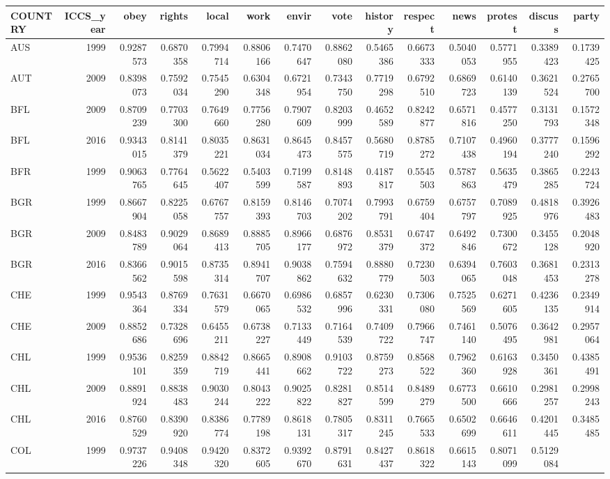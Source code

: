 \documentclass[]{article}
\begin{document}
\begin{longtable}[]{@{}lrrrrrrrrrrrrr@{}}
\toprule
COUNTRY & ICCS\_year & obey & rights & local & work & envir & vote &
history & respect & news & protest & discuss & party\tabularnewline
\midrule
\endhead
AUS & 1999 & 0.9287573 & 0.6870358 & 0.7994714 & 0.8806166 & 0.7470647 &
0.8862080 & 0.5465386 & 0.6673333 & 0.5040053 & 0.5771955 & 0.3389423 &
0.1739425\tabularnewline
AUT & 2009 & 0.8398073 & 0.7592034 & 0.7545290 & 0.6304348 & 0.6721954 &
0.7343750 & 0.7719298 & 0.6792510 & 0.6869723 & 0.6140139 & 0.3621524 &
0.2765700\tabularnewline
BFL & 2009 & 0.8709239 & 0.7703300 & 0.7649660 & 0.7756280 & 0.7907609 &
0.8203999 & 0.4652589 & 0.8242877 & 0.6571816 & 0.4577250 & 0.3131793 &
0.1572348\tabularnewline
BFL & 2016 & 0.9343015 & 0.8141379 & 0.8035221 & 0.8631034 & 0.8645473 &
0.8457575 & 0.5680719 & 0.8785272 & 0.7107438 & 0.4960194 & 0.3777240 &
0.1596292\tabularnewline
BFR & 1999 & 0.9063765 & 0.7764645 & 0.5622407 & 0.5403599 & 0.7199587 &
0.8148893 & 0.4187817 & 0.5545503 & 0.5787863 & 0.5635479 & 0.3865285 &
0.2243724\tabularnewline
BGR & 1999 & 0.8667904 & 0.8225058 & 0.6767757 & 0.8159393 & 0.8146703 &
0.7074202 & 0.7993791 & 0.6759404 & 0.6757797 & 0.7089925 & 0.4818976 &
0.3926483\tabularnewline
BGR & 2009 & 0.8483789 & 0.9029064 & 0.8689413 & 0.8885705 & 0.8966177 &
0.6876972 & 0.8531379 & 0.6747372 & 0.6492846 & 0.7300672 & 0.3455128 &
0.2048920\tabularnewline
BGR & 2016 & 0.8366562 & 0.9015598 & 0.8735314 & 0.8941707 & 0.9038862 &
0.7594632 & 0.8880779 & 0.7230503 & 0.6394065 & 0.7603048 & 0.3681453 &
0.2313278\tabularnewline
CHE & 1999 & 0.9543364 & 0.8769334 & 0.7631579 & 0.6670065 & 0.6986532 &
0.6857996 & 0.6230331 & 0.7306080 & 0.7525569 & 0.6271605 & 0.4236135 &
0.2349914\tabularnewline
CHE & 2009 & 0.8852686 & 0.7328696 & 0.6455211 & 0.6738227 & 0.7133449 &
0.7164539 & 0.7409722 & 0.7966747 & 0.7461140 & 0.5076495 & 0.3642981 &
0.2957064\tabularnewline
CHL & 1999 & 0.9536101 & 0.8259359 & 0.8842719 & 0.8665441 & 0.8908662 &
0.9103722 & 0.8759273 & 0.8568522 & 0.7962360 & 0.6163928 & 0.3450361 &
0.4385491\tabularnewline
CHL & 2009 & 0.8891924 & 0.8838483 & 0.9030244 & 0.8043222 & 0.9025822 &
0.8281827 & 0.8514599 & 0.8489279 & 0.6773500 & 0.6610666 & 0.2981257 &
0.2998243\tabularnewline
CHL & 2016 & 0.8760529 & 0.8390920 & 0.8386774 & 0.7789198 & 0.8618131 &
0.7805317 & 0.8311245 & 0.7665533 & 0.6502699 & 0.6646611 & 0.4201445 &
0.3485485\tabularnewline
COL & 1999 & 0.9737226 & 0.9408348 & 0.9420320 & 0.8372605 & 0.9392670 &
0.8791631 & 0.8427437 & 0.8618322 & 0.6615143 & 0.8071099 & 0.5129084 &

\end{longtable}
\end{document}
